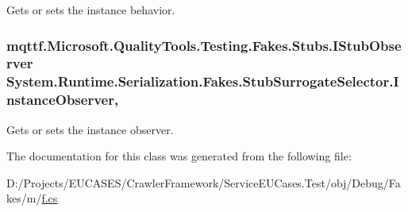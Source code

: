 Gets or sets the instance behavior.

\hypertarget{class_system_1_1_runtime_1_1_serialization_1_1_fakes_1_1_stub_surrogate_selector_ad3d1fc8b39523b8192d761001107ee5c}{
\subsubsection[{Instance\-Observer}]{\setlength{\rightskip}{0pt plus 5cm}mqttf.\-Microsoft.\-Quality\-Tools.\-Testing.\-Fakes.\-Stubs.\-I\-Stub\-Observer System.\-Runtime.\-Serialization.\-Fakes.\-Stub\-Surrogate\-Selector.\-Instance\-Observer\hspace{0.3cm}{\ttfamily [get]}, {\ttfamily [set]}}}\label{class_system_1_1_runtime_1_1_serialization_1_1_fakes_1_1_stub_surrogate_selector_ad3d1fc8b39523b8192d761001107ee5c}


Gets or sets the instance observer.



The documentation for this class was generated from the following file\-:\begin{DoxyCompactItemize}
\item 
D\-:/\-Projects/\-E\-U\-C\-A\-S\-E\-S/\-Crawler\-Framework/\-Service\-E\-U\-Cases.\-Test/obj/\-Debug/\-Fakes/m/\hyperlink{m_2f_8cs}{f.\-cs}\end{DoxyCompactItemize}
